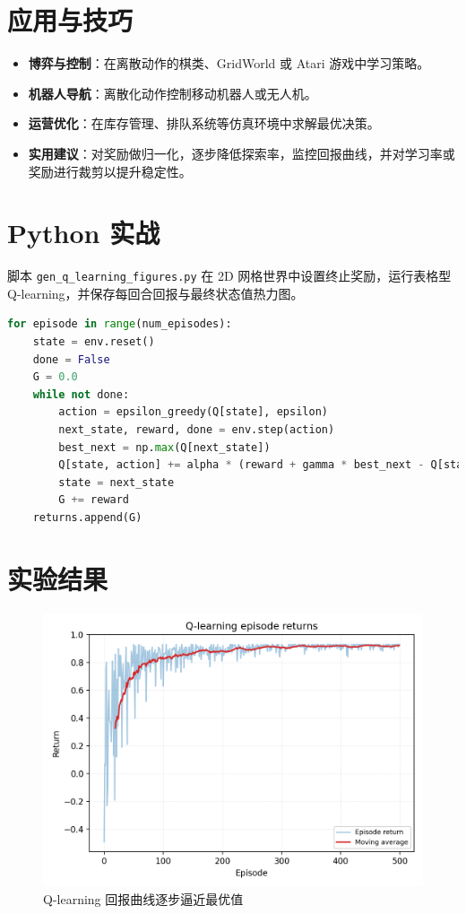 \documentclass[UTF8,zihao=-4]{ctexart}
\begin{document}
\section{应用与技巧}
\begin{itemize}
  \item \textbf{博弈与控制}：在离散动作的棋类、GridWorld 或 Atari 游戏中学习策略。
  \item \textbf{机器人导航}：离散化动作控制移动机器人或无人机。
  \item \textbf{运营优化}：在库存管理、排队系统等仿真环境中求解最优决策。
  \item \textbf{实用建议}：对奖励做归一化，逐步降低探索率，监控回报曲线，并对学习率或奖励进行裁剪以提升稳定性。
\end{itemize}

\section{Python 实战}
脚本 \texttt{gen\_q\_learning\_figures.py} 在 2D 网格世界中设置终止奖励，运行表格型 Q-learning，并保存每回合回报与最终状态值热力图。
\begin{lstlisting}[language=Python,caption={脚本 gen_q_learning_figures.py 片段}]
for episode in range(num_episodes):
    state = env.reset()
    done = False
    G = 0.0
    while not done:
        action = epsilon_greedy(Q[state], epsilon)
        next_state, reward, done = env.step(action)
        best_next = np.max(Q[next_state])
        Q[state, action] += alpha * (reward + gamma * best_next - Q[state, action])
        state = next_state
        G += reward
    returns.append(G)
\end{lstlisting}

\section{实验结果}
\begin{figure}[H]
  \centering
  \includegraphics[width=0.8\linewidth]{q_learning_returns.png}
  \caption{Q-learning 回报曲线逐步逼近最优值}
  \label{fig:q_learning_returns_cn}
\end{figure}
\end{document}
